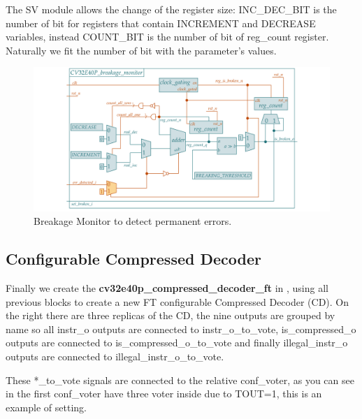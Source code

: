 {{{    	    The SV module allows the change of the register size: INC\_DEC\_BIT is the number of bit for registers that contain INCREMENT and DECREASE variables, instead COUNT\_BIT is the number of bit of reg\_count register.
    	    Naturally we fit the number of bit with the parameter's values.\\
    	    
    	    \begin{figure}[H]
        		\centering
        		\includegraphics[width=1.3\textwidth,center]{./images/cv32e40p_breakage_monitor.png}
        		\caption{Breakage Monitor to detect permanent errors.}
        		\label{fig:cv32e40p_breakage_monitor}
        	\end{figure} 	
    	}%
    	\vspace{1cm}
    	
    	\subsection{Configurable Compressed Decoder}{
    	    \label{FTCD}
        	Finally we create the \textbf{cv32e40p\_compressed\_decoder\_ft} in , using all previous blocks to create a new FT configurable Compressed Decoder (CD).
    		On the right there are three replicas of the CD, the nine outputs are grouped by name so all instr\_o outputs are connected to instr\_o\_to\_vote, is\_compressed\_o outputs are connected to is\_compressed\_o\_to\_vote and finally illegal\_instr\_o outputs are connected to illegal\_instr\_o\_to\_vote.
    		
    		These *\_to\_vote signals are connected to the relative conf\_voter, as you can see in  the first conf\_voter have three voter inside due to TOUT=1, this is an example of setting.\\
    	
}}}
